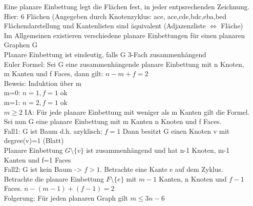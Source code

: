 \documentclass[a4paper]{article}
\begin{document}
Eine planare Einbettung legt die Flächen fest, in jeder entpsrechenden Zeichnung.\\
Hier: 6 Flächen (Angegeben durch Knotenzyklus: ace, ace,cde,bdc,eba,bed\\
Flächendarstellung und Kantenlisten sind äquivalent (Adjazenzliste $\Leftrightarrow$ Fläche)\\
Im Allgemeinen existieren verschiedene planare Einbettungen für einen planaren Graphen G\\
Planare Einbettung ist eindeutig, falls G 3-Fach zusammenhängend\\
Euler Formel: Sei G eine zusammenhängende planare Einbettung mit n Knoten, m Kanten und f Faces, dann gilt: $n-m+f=2$\\
Beweis: Induktion über m\\
m=0: $n=1, f=1 $ ok\\
m=1: $n=2, f=1 $ ok\\
$m\geq 2$ IA: Für jede planare Einbettung mit weniger als m Kanten gilt die Formel. Sei nun G eine planare Einbettung mit m Kanten n Knoten und f Faces.\\
Fall1: G ist Baum d.h. azyklisch: $f=1$ Dann besitzt G einen Knoten v mit degree(v)=1 (Blatt)\\
Planare Einbettung $G\setminus \{v\}$ ist zusammenhängend und hat n-1 Knoten, m-1 Kanten und f=1 Faces\\
Fall2: G ist kein Baum -> $f>1$. Betrachte eine Kante e auf dem Zyklus. Betrachte die planare Einbettung $F\setminus\{e\}$ mit $m-1$ Kanten, n Knoten und $f-1$ Faces. $n-(m-1)+(f-1)=2$\\
Folgerung: Für jeden planaren Graph gilt $m\leq 3n -6$\\
\end{document}
